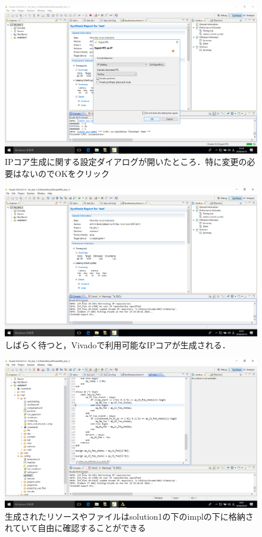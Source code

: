 \documentclass[a4paper,dvipdfmx]{jsarticle}
\begin{document}
 \begin{figure}[H]
  \begin{center}
   \includegraphics[width=.8\textwidth]{chapter08_figures/VirtualBox_Windows10_19_03_2018_23_21_04.png}
  \end{center}
  \caption{IPコア生成に関する設定ダイアログが開いたところ．特に変更の必要はないのでOKをクリック}
 \end{figure}

 \begin{figure}[H]
  \begin{center}
   \includegraphics[width=.8\textwidth]{chapter08_figures/VirtualBox_Windows10_19_03_2018_23_21_59.png}
  \end{center}
  \caption{しばらく待つと，Vivadoで利用可能なIPコアが生成される．}
 \end{figure}

 \begin{figure}[H]
  \begin{center}
   \includegraphics[width=.8\textwidth]{chapter08_figures/VirtualBox_Windows10_20_03_2018_00_22_51.png}
  \end{center}
  \caption{生成されたリソースやファイルはsolution1の下のimplの下に格納されていて自由に確認することができる}
 \end{figure}
\end{document}
